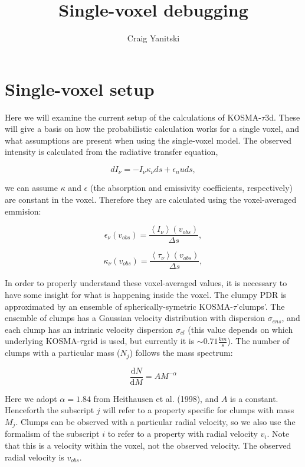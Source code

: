 \documentclass[a4paper]{article}
\newcommand{\kosmatau}{KOSMA-\(\tau\)}
\begin{document}
    \title{Single-voxel debugging}
    \author{Craig Yanitski}
    \maketitle

    \section{Single-voxel setup}
    \label{setup}

    Here we will examine the current setup of the calculations of \kosmatau3d.
    These will give a basis on how the probabilistic calculation works for a single voxel, and what assumptions are present when using the single-voxel model.
    The observed intensity is calculated from the radiative transfer equation,

    \[
    dI_\nu = - I_\nu \kappa_\nu ds + \epsilon_nu ds,
    \]

    we can assume \(\kappa\) and \(\epsilon\) (the absorption and emissivity coefficients, respectively) are constant in the voxel.
    Therefore they are calculated using the voxel-averaged emmision:

    \[
    \epsilon_\nu (v_{obs}) = \frac{\left<I_\nu\right> (v_{obs})}{\Delta s},
    \]

    \[
    \kappa_\nu (v_{obs}) = \frac{\left<\tau_\nu\right> (v_{obs})}{\Delta s},
    \]

    In order to properly understand these voxel-averaged values, it is necessary to have some insight for what is happening inside the voxel.
    The clumpy PDR is approximated by an ensemble of spherically-symetric \kosmatau 'clumps'.
    The ensemble of clumps has a Gaussian velocity distribution with dispersion \(\sigma_{ens}\), and each clump has an intrinsic velocity dispersion \(\sigma_{cl}\) (this value depends on which underlying \kosmatau grid is used, but currently it is \(\sim0.71 \frac{km}{s}\)).
    The number of clumps with a particular mass (\(N_j\)) follows the mass spectrum:

    \[
    \frac{\mathrm{d}N}{\mathrm{d}M} = A M^{-\alpha}
    \]

    Here we adopt \(\alpha=1.84\) from Heithausen et al. (1998), and \(A\) is a constant.
    Henceforth the subscript \(j\) will refer to a property specific for clumps with mass \(M_j\).
    Clumps can be observed with a particular radial velocity, so we also use the formalism of the subscript \(i\) to refer to a property with radial velocity \(v_i\).
    Note that this is a velocity within the voxel, not the observed velocity.
    The observed radial velocity is \(v_{obs}\).
\end{document}
